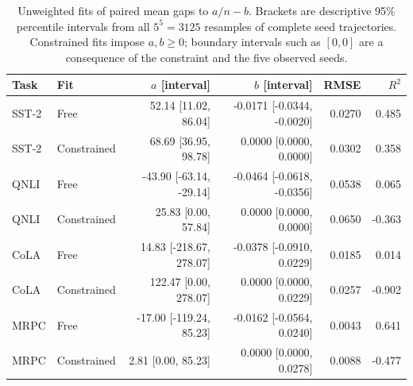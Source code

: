 \begin{table}[t]
\centering\scriptsize
\caption{Unweighted fits of paired mean gaps to $a/n-b$. Brackets are descriptive 95\% percentile intervals from all $5^5=3125$ resamples of complete seed trajectories. Constrained fits impose $a,b\geq0$; boundary intervals such as $[0,0]$ are a consequence of the constraint and the five observed seeds.}
\label{tab:e1_paired_fit}
\begin{tabular}{llrrrr}
\toprule
Task & Fit & $a$ [interval] & $b$ [interval] & RMSE & $R^2$ \\
\midrule
SST-2 & Free & 52.14 [11.02, 86.04] & -0.0171 [-0.0344, -0.0020] & 0.0270 & 0.485 \\
SST-2 & Constrained & 68.69 [36.95, 98.78] & 0.0000 [0.0000, 0.0000] & 0.0302 & 0.358 \\
QNLI & Free & -43.90 [-63.14, -29.14] & -0.0464 [-0.0618, -0.0356] & 0.0538 & 0.065 \\
QNLI & Constrained & 25.83 [0.00, 57.84] & 0.0000 [0.0000, 0.0000] & 0.0650 & -0.363 \\
CoLA & Free & 14.83 [-218.67, 278.07] & -0.0378 [-0.0910, 0.0229] & 0.0185 & 0.014 \\
CoLA & Constrained & 122.47 [0.00, 278.07] & 0.0000 [0.0000, 0.0229] & 0.0257 & -0.902 \\
MRPC & Free & -17.00 [-119.24, 85.23] & -0.0162 [-0.0564, 0.0240] & 0.0043 & 0.641 \\
MRPC & Constrained & 2.81 [0.00, 85.23] & 0.0000 [0.0000, 0.0278] & 0.0088 & -0.477 \\
\bottomrule
\end{tabular}
\end{table}
